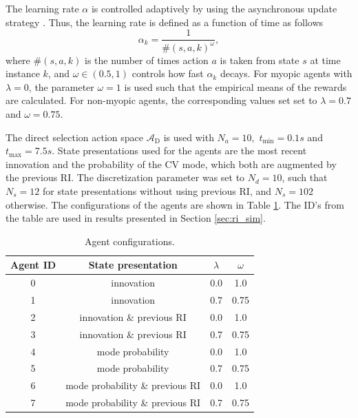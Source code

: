 \documentclass[english, 12pt, a4paper, elec, utf8, a-1b, online]{aaltothesis}
\newcommand{\As}{\mathcal{A}}
\newcommand{\tmax}{t_\text{max}}
\newcommand{\tmin}{t_\text{min}}
\newcommand{\Asdir}{\As_\text{D}}
\begin{document}
The learning rate $\alpha$ is controlled adaptively by using the asynchronous update strategy \cite{Even-Dar2003}.
Thus, the learning rate is defined as a function of time as follows
\begin{equation}
    \alpha_k = \frac{1}{\#(s, a, k)^\omega},
\end{equation}
where $\#(s, a, k)$ is the number of times action $a$ is taken from state $s$ at time instance $k$, and $\omega \in (0.5, 1)$ controls how fast $\alpha_k$ decays.
For myopic agents with $\lambda=0$, the parameter $\omega=1$ is used such that the empirical means of the rewards are calculated.
For non-myopic agents, the corresponding values set set to $\lambda=0.7$ and $\omega=0.75$. 

The direct selection action space $\Asdir$ is used with $N_a=10,$ $\tmin=0.1s$ and $\tmax=7.5s$.
State presentations used for the agents are the most recent innovation and the probability of the CV mode, which both are augmented by the previous RI.
The discretization parameter was set to $N_d=10$, such that $N_s=12$ for state presentations without using previous RI, and $N_s=102$ otherwise.
The configurations of the agents are shown in Table \ref{tab:agent_configurations}. The ID's from the table are used in results presented in Section \ref{sec:ri_sim}.

\begin{table}[t]
    \centering
    \begin{tabular}{|c | c | c |c |}
        \hline
        \textbf{Agent ID} & \textbf{State presentation}  & $\lambda$  &  $\omega$ \\
        \hline
        0 & innovation & 0.0 & 1.0 \\ \hline
        1 & innovation & 0.7 & 0.75 \\ \hline
        2 & innovation \& previous RI &  0.0 & 1.0 \\ \hline
        3 & innovation \& previous RI & 0.7 & 0.75 \\ \hline
        4 & mode probability &  0.0 & 1.0 \\ \hline
        5 & mode probability & 0.7 & 0.75 \\ \hline 
        6 & mode probability \& previous RI &  0.0 & 1.0 \\ \hline 
        7 & mode probability \& previous RI & 0.7 & 0.75 \\
        \hline
    \end{tabular}
    \caption{Agent configurations.}
    \label{tab:agent_configurations}
\end{table}
\end{document}
